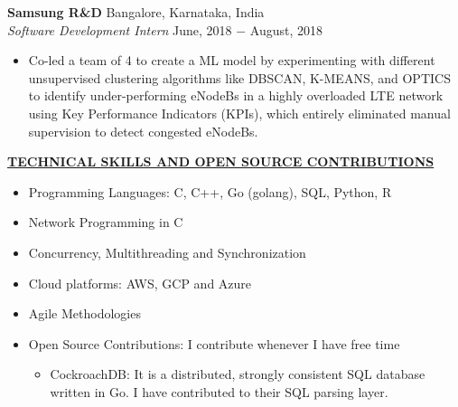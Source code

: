 \documentclass{article}
\begin{document}
\noindent \textbf{Samsung R\&D} \hfill Bangalore, Karnataka, India \\
\textit{Software Development Intern} \hfill June, 2018 $-$ August, 2018
\begin{itemize}[noitemsep,nolistsep,leftmargin=*]
\item {Co-led a team of 4 to create a ML model by experimenting with different unsupervised clustering algorithms like DBSCAN, K-MEANS, and OPTICS to identify under-performing eNodeBs in a highly overloaded LTE network using Key Performance Indicators (KPIs), which entirely eliminated manual supervision to detect congested eNodeBs. \\}
\end{itemize}

\noindent \textbf{\underline{TECHNICAL SKILLS AND OPEN SOURCE CONTRIBUTIONS}}
\begin{itemize}[noitemsep,nolistsep,leftmargin=*]
\item {Programming Languages: C, C++, Go (golang), SQL, Python, R}
\item {Network Programming in C}
\item {Concurrency, Multithreading and Synchronization}
\item {Cloud platforms: AWS, GCP and Azure}
\item {Agile Methodologies}
\item {Open Source Contributions: I contribute whenever I have free time}
\begin{itemize}
    \item CockroachDB: It is a distributed, strongly consistent SQL database written in Go. I have contributed to their SQL parsing layer. \\
\end{itemize}
\end{itemize}

%
%
\end{document}
